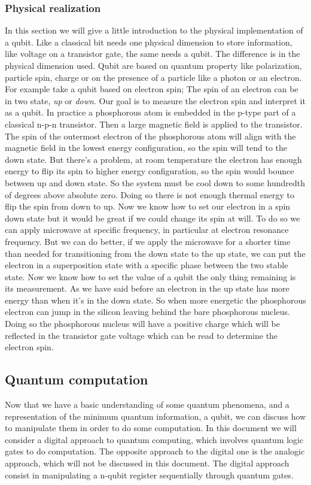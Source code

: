 \documentclass[main.tex]{subfiles}
\theoremstyle{definition}
\begin{document}
		\subsubsection{Physical realization}
		In this section we will give a little introduction to the physical implementation of a qubit. Like a classical bit needs
		one physical dimension to store information, like voltage on a transistor gate, the same needs a qubit. The difference is in 
		the physical dimension used. Qubit are based on quantum property like polarization, particle spin, charge or on the presence of a 
		particle like a photon or an electron. 
		For example take a qubit based on electron spin; The spin of an electron can be in two state, \textit{up} or \textit{down}. 
		Our goal is to measure the electron spin and interpret it as a qubit.
		In practice a phosphorous atom is embedded in the p-type part of a classical n-p-n transistor.
		Then a large magnetic field is applied to the transistor. The spin of the outermost electron of the phosphorous atom will 
		align with the magnetic field in the lowest energy configuration, so the spin will tend to the down state. But there's a 
		problem, at room temperature the electron has enough energy to flip its spin to higher energy configuration, so the spin 
		would bounce between up and down state. So the system must be cool down to some hundredth of degrees above absolute zero. 
		Doing so there is not enough thermal energy to flip the spin from down to up. Now we know how to set our electron in a 
		spin down state but it would be great if we could change its spin at will. To do so we can apply microwave at specific 
		frequency, in particular at electron resonance frequency. But we can do better, if we apply the microwave for a shorter time than
		needed for transitioning from the down state to the up state, we can put the electron in a superposition state with a specific phase 
		between the two stable state. Now we know how to set the value of a qubit the only thing remaining is its measurement.
		As we have said before an electron in the up state has more energy than when it's in the down state. So when more energetic the 
		phosphorous electron can jump in the silicon leaving behind the bare phosphorous nucleus. Doing so the phosphorous nucleus will 
		have a positive charge which will be reflected in the transistor gate voltage which can be read to determine the electron spin.
	
	\subsection{Quantum computation}
	Now that we have a basic understanding of some quantum phenomena, and a representation of the minimum quantum information, a qubit, 
	we can discuss how to manipulate them in order to do some computation.
	In this document we will consider a digital approach to quantum computing, which involves quantum logic gates to do computation. 
	The opposite approach to the digital one is the analogic approach, which will not be discussed in this document.
	The digital approach consist in manipulating a n-qubit register sequentially through quantum gates.
	
\end{document}
